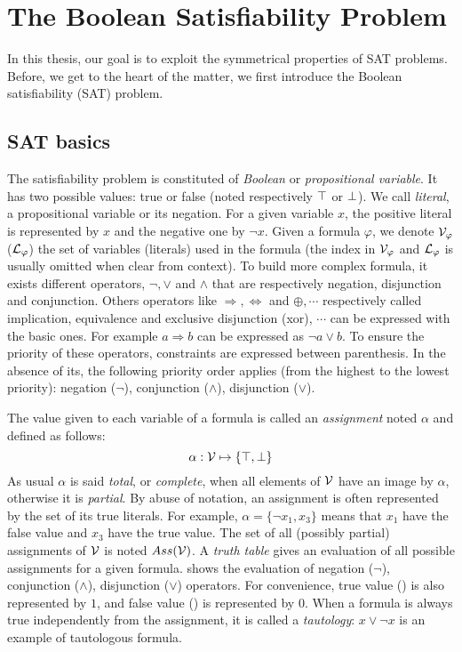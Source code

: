 \chapter{The Boolean Satisfiability Problem}\label{chap:preliminaries}
\minitoc
In this thesis, our goal is to exploit the symmetrical properties of SAT problems.
Before, we get to the heart of the matter, we first introduce the Boolean satisfiability (SAT)  problem.



\section{SAT basics}
The satisfiability problem is constituted of \emph{Boolean} or \emph{propositional variable}.
It has two possible values: true or false (noted respectively $\top$ or $\bot$).
We call \emph{literal}, a propositional variable or its negation.
For a given variable $x$, the positive literal is represented by $x$ and the negative one by $\neg x$.
Given a formula $\varphi$, we denote $\mathcal{V}_\varphi$ ($\mathcal{L}_\varphi$) the set of variables (literals) used in the formula (the index in $\mathcal{V}_\varphi$ and $\mathcal{L}_\varphi$ is usually omitted when
clear from context).
To build more complex formula, it exists different operators, $\neg, \lor$ and $\land$ that are respectively negation, disjunction and conjunction. Others operators like $\Rightarrow, \Leftrightarrow$ and
$\oplus, \cdots$ respectively called implication, equivalence and exclusive disjunction (xor), $\cdots$ can be 
expressed with the basic ones.
For example $a \Rightarrow b$ can be expressed as $ \neg a \lor b$.
To ensure the priority of these operators, constraints are expressed between parenthesis.
In the absence of its, the following priority order applies (from the highest to the lowest priority):
negation ($\neg$), conjunction ($\land$), disjunction ($\lor$).


The value given to each variable of a formula is called an \emph{assignment} noted $\alpha$ and defined as follows:
 $$\alpha: \mathcal{V} \mapsto \{ \top, \bot \}$$
 As usual $\alpha$ is said \emph{total}, or \emph{complete}, when all elements of $\mathcal{V}$ have an image by
$\alpha$, otherwise it is \emph{partial}. By abuse of notation, an assignment is
often represented by the set of its true literals. For example, $\alpha = \{\neg x_1, x_3 \}$ means that $x_1$
have the false value and $x_3$ have the true value.
  The set of all (possibly partial) assignments of $\mathcal{V}$ is noted $Ass(\mathcal{V})$.
A \emph{truth table} gives an evaluation of all possible assignments for a given formula.
 shows the evaluation of negation ($\neg$), conjunction ($\land$), disjunction ($\lor$) operators.
For convenience, true value (\true) is also represented by $1$, and false value (\false) is represented by $0$.
When a formula is always true independently from the assignment, it is called a \emph{tautology}: $x \lor \neg x$ is 
an example of tautologous formula.


